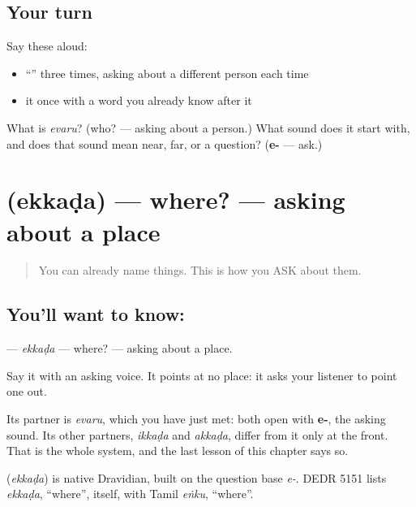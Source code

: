 \subsection*{Your turn}
Say these aloud:

\begin{itemize}
\raggedright
  \item \textquotedblleft{}\textquotedblright{} three times, asking about a different person each time
  \item it once with a word you already know after it
\end{itemize}

\begin{tcolorbox}[breakable,colback=teal!4,colframe=teal!35!black,title={Before you move on}]
What is \emph{evaru}? (who? — asking about a person.) What sound does it start with, and does that sound mean near, far, or a question? (\textbf{e-} — ask.)
\end{tcolorbox}
\section[\texorpdfstring{\te{ఎక్కడ} (ekkaḍa)}{ఎక్కడ (ekkaḍa)}]{ (ekkaḍa) — where? — asking about a place}

\label{lesson:TE-C41-where}



\begin{quote}
You can already name things. This is how you ASK about them.
\end{quote}

\subsection*{You'll want to know: }
\textbf{} — \emph{ekkaḍa} — where? — asking about a place.

Say it with an asking voice. It points at no place: it asks your listener to point one out.

Its partner is \textbf{} \emph{evaru}, which you have just met: both open with \textbf{e-}, the asking sound. Its other partners, \textbf{} \emph{ikkaḍa} and \textbf{} \emph{akkaḍa}, differ from it only at the front. That is the whole system, and the last lesson of this chapter says so.

\begin{cousinweb}
\textbf{} (\emph{ekkaḍa}) is native Dravidian, built on the question base \emph{e-}. DEDR 5151 lists \emph{ekkaḍa}, \textquotedblleft{}where\textquotedblright{}, itself, with Tamil \emph{eṅku}, \textquotedblleft{}where\textquotedblright{}.
\end{cousinweb}


